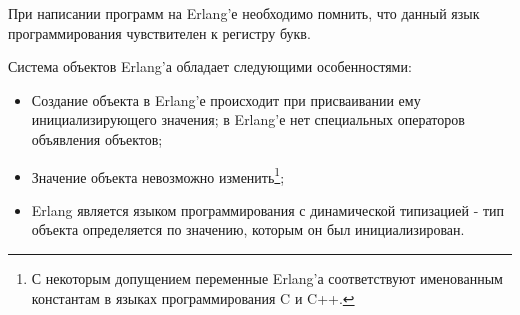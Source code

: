 При написании программ на Erlang'е необходимо помнить, что данный язык программирования чувствителен к регистру букв.


Система объектов Erlang'а обладает следующими особенностями:

\begin{itemize}

	\item Создание объекта в Erlang'е происходит при присваивании ему инициализирующего значения; в Erlang'е нет специальных операторов объявления объектов;
	\item Значение объекта невозможно изменить\footnote{С некоторым допущением переменные Erlang'а соответствуют именованным константам в языках программирования C и C++.};
	\item Erlang является языком программирования с динамической типизацией - тип объекта определяется по значению, которым он был инициализирован.

\end{itemize}

